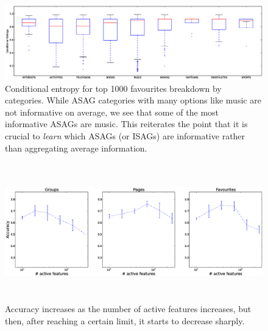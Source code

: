 \begin{figure}[tbp!]
\hspace{-12mm}\includegraphics[width=200mm]{data/plots/boxPlots/CEvsFavTypes.eps}
\vspace{-7mm}
\caption{Conditional entropy for top 1000 favourites breakdown by categories.  While ASAG categories
with many options like music are not informative on average, we see
that some of the most informative ASAGs are music.  This reiterates
the point that it is crucial to \emph{learn} which ASAGs (or ISAGs)
are informative rather than aggregating average information.}
\label{Fig5}
\end{figure}

\begin{figure}[tbp!]
\centering
\includegraphics[width=180mm, height=60mm]{data/plots/new/accuracyVsactiveFeatures.eps}
\vspace{-3mm}
\caption{Accuracy increases as the number of active features increases, but then, after reaching a certain limit, it starts to decrease sharply.
}
\label{fig:AccuracyVsactiveFeats}
\end{figure}

